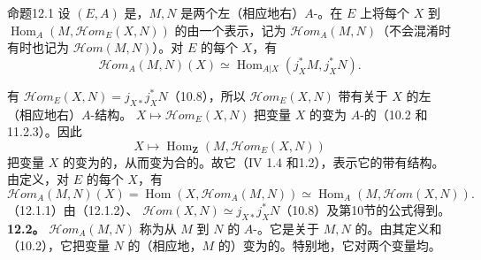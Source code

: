 \begin{SGAresult}{命题}{12.1}
设 $(E,A)$ 是，$M,N$ 是两个左（相应地右）$A$-。在 $E$ 上将每个 $X$ 到 $\operatorname{Hom}_A(M,\mathscr{H}\!om_E(X,N))$ 的由一个表示，记为 $\mathscr{H}\!om_A(M,N)$（不会混淆时有时也记为 $\mathscr{H}\!om(M,N)$）。对 $E$ 的每个 $X$，有
\[\mathscr{H}\!om_A(M,N)(X)\simeq\operatorname{Hom}_{A|X}(j_X^*M,j_X^*N).\tag{12.1.1}\]
\end{SGAresult}
有 $\mathscr{H}\!om_E(X,N)=j_{X*}j_X^*N$（10.8），所以 $\mathscr{H}\!om_E(X,N)$ 带有关于 $X$ 的左（相应地右）$A$-结构。 $X\mapsto\mathscr{H}\!om_E(X,N)$ 把变量 $X$ 的变为 $A$-的（10.2 和11.2.3）。因此
\[X\longmapsto\operatorname{Hom}_{\mathbf Z}(M,\mathscr{H}\!om_E(X,N))\]
把变量 $X$ 的变为的，从而变为合的。故它（IV 1.4 和1.2），表示它的带有结构。由定义，对 $E$ 的每个 $X$，有
\[
\mathscr{H}\!om_A(M,N)(X)=\operatorname{Hom}(X,\mathscr{H}\!om_A(M,N))\simeq\operatorname{Hom}_A(M,\mathscr{H}\!om(X,N)).\tag{12.1.2}
\]
（12.1.1）由（12.1.2）、 $\mathscr{H}\!om(X,N)\simeq j_{X*}j_X^*N$（10.8）及第10节的公式得到。
\textbf{12.2。} $\mathscr{H}\!om_A(M,N)$ 称为从 $M$ 到 $N$ 的 $A$-。它是关于 $M,N$ 的。由其定义和（10.2），它把变量 $N$ 的（相应地，$M$ 的）变为的。特别地，它对两个变量均。
